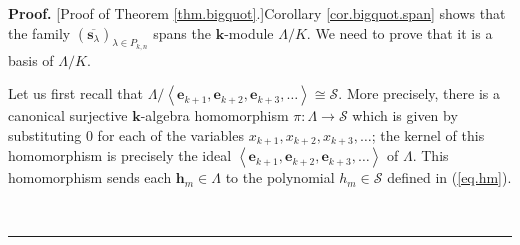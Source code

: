 \documentclass[numbers=enddot,12pt,final,onecolumn,notitlepage]{scrartcl}%
\theoremstyle{definition}
\newenvironment{proof}[1][Proof]{\noindent\textbf{#1.} }{\ \rule{0.5em}{0.5em}}
\begin{document}
\begin{proof}
[Proof of Theorem \ref{thm.bigquot}.]Corollary \ref{cor.bigquot.span} shows
that the family $\left(  \overline{\mathbf{s}_{\lambda}}\right)  _{\lambda\in
P_{k,n}}$ spans the $\mathbf{k}$-module $\Lambda/K$. We need to prove that it
is a basis of $\Lambda/K$.

Let us first recall that $\Lambda/\left\langle \mathbf{e}_{k+1},\mathbf{e}%
_{k+2},\mathbf{e}_{k+3},\ldots\right\rangle \cong\mathcal{S}$. More precisely,
there is a canonical surjective $\mathbf{k}$-algebra homomorphism $\pi
:\Lambda\rightarrow\mathcal{S}$ which is given by substituting $0$ for each of
the variables $x_{k+1},x_{k+2},x_{k+3},\ldots$; the kernel of this
homomorphism is precisely the ideal $\left\langle \mathbf{e}_{k+1}%
,\mathbf{e}_{k+2},\mathbf{e}_{k+3},\ldots\right\rangle $ of $\Lambda$. This
homomorphism sends each $\mathbf{h}_{m}\in\Lambda$ to the polynomial $h_{m}%
\in\mathcal{S}$ defined in (\ref{eq.hm}).


\end{proof}
\end{document}
